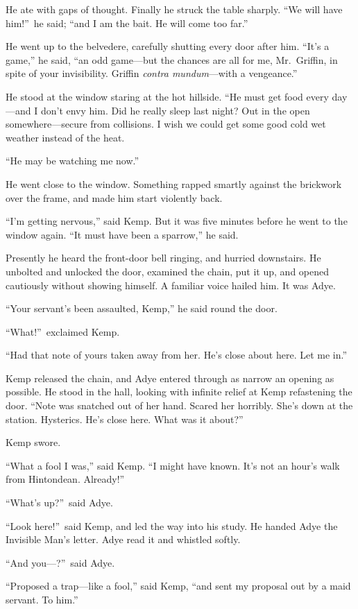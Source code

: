 He ate with gaps of thought. Finally he struck the table sharply. “We will have him!”\ he said; “and I am the bait. He will come too far.”

He went up to the belvedere, carefully shutting every door after him. “It’s a game,” he said, “an odd game—but the chances are all for me, Mr.\ Griffin, in spite of your invisibility. Griffin \emph{contra mundum}—with a vengeance.”

He stood at the window staring at the hot hillside. “He must get food every day—and I don’t envy him. Did he really sleep last night? Out in the open somewhere—secure from collisions. I wish we could get some good cold wet weather instead of the heat.

“He may be watching me now.”

He went close to the window. Something rapped smartly against the brickwork over the frame, and made him start violently back.

“I’m getting nervous,” said Kemp. But it was five minutes before he went to the window again. “It must have been a sparrow,” he said.

Presently he heard the front-door bell ringing, and hurried downstairs. He unbolted and unlocked the door, examined the chain, put it up, and opened cautiously without showing himself. A familiar voice hailed him. It was Adye.

“Your servant’s been assaulted, Kemp,” he said round the door.

“What!”\ exclaimed Kemp.

“Had that note of yours taken away from her. He’s close about here. Let me in.”

Kemp released the chain, and Adye entered through as narrow an opening as possible. He stood in the hall, looking with infinite relief at Kemp refastening the door. “Note was snatched out of her hand. Scared her horribly. She’s down at the station. Hysterics. He’s close here. What was it about?”

Kemp swore.

“What a fool I was,” said Kemp. “I might have known. It’s not an hour’s walk from Hintondean. Already!”

“What’s up?”\ said Adye.

“Look here!”\ said Kemp, and led the way into his study. He handed Adye the Invisible Man’s letter. Adye read it and whistled softly.

“And you—?”\ said Adye.

“Proposed a trap—like a fool,” said Kemp, “and sent my proposal out by a maid servant. To him.”

